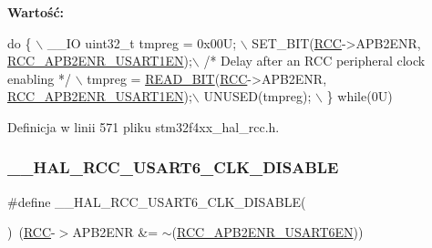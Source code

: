 {\bfseries Wartość\+:}
\begin{DoxyCode}
\textcolor{keywordflow}{do} \{ \(\backslash\)
                                        \_\_IO uint32\_t tmpreg = 0x00U; \(\backslash\)
                                        SET\_BIT(\hyperlink{group___peripheral__declaration_ga74944438a086975793d26ae48d5882d4}{RCC}->APB2ENR, 
      \hyperlink{group___peripheral___registers___bits___definition_ga4666bb90842e8134b32e6a34a0f165f3}{RCC\_APB2ENR\_USART1EN});\(\backslash\)
                                        \textcolor{comment}{/* Delay after an RCC peripheral clock enabling */} \(\backslash\)
                                        tmpreg = \hyperlink{group___exported__macro_ga822bb1bb9710d5f2fa6396b84e583c33}{READ\_BIT}(\hyperlink{group___peripheral__declaration_ga74944438a086975793d26ae48d5882d4}{RCC}->APB2ENR, 
      \hyperlink{group___peripheral___registers___bits___definition_ga4666bb90842e8134b32e6a34a0f165f3}{RCC\_APB2ENR\_USART1EN});\(\backslash\)
                                        UNUSED(tmpreg); \(\backslash\)
                                          \} \textcolor{keywordflow}{while}(0U)
\end{DoxyCode}


Definicja w linii 571 pliku stm32f4xx\+\_\+hal\+\_\+rcc.\+h.

\mbox{\label{group___r_c_c___a_p_b2___clock___enable___disable_gac4b142412ef1e3dab8dcf5d5f7ca4d92}} 
\subsubsection{\texorpdfstring{\+\_\+\+\_\+\+H\+A\+L\+\_\+\+R\+C\+C\+\_\+\+U\+S\+A\+R\+T6\+\_\+\+C\+L\+K\+\_\+\+D\+I\+S\+A\+B\+LE}{\_\_HAL\_RCC\_USART6\_CLK\_DISABLE}}
{\footnotesize\ttfamily \#define \+\_\+\+\_\+\+H\+A\+L\+\_\+\+R\+C\+C\+\_\+\+U\+S\+A\+R\+T6\+\_\+\+C\+L\+K\+\_\+\+D\+I\+S\+A\+B\+LE(\begin{DoxyParamCaption}{ }\end{DoxyParamCaption})~(\hyperlink{group___peripheral__declaration_ga74944438a086975793d26ae48d5882d4}{R\+CC}-\/$>$A\+P\+B2\+E\+NR \&= $\sim$(\hyperlink{group___peripheral___registers___bits___definition_ga0569d91f3b18ae130b7a09e0100c4459}{R\+C\+C\+\_\+\+A\+P\+B2\+E\+N\+R\+\_\+\+U\+S\+A\+R\+T6\+EN}))}



